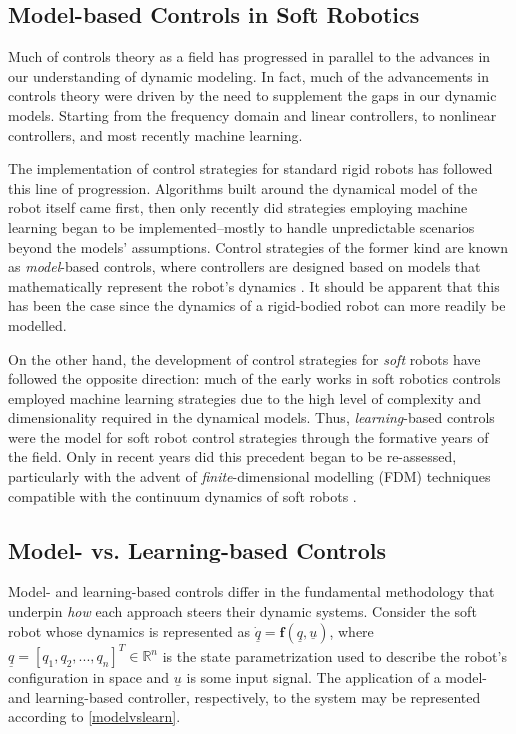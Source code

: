 \subsection{Model-based Controls in Soft Robotics} \label{modelbasedinsoro}
Much of controls theory as a field has progressed in parallel to the advances in our understanding of dynamic modeling. In fact, much of the advancements in controls theory were driven by the need to supplement the gaps in our dynamic models. Starting from the frequency domain and linear controllers, to nonlinear controllers, and most recently machine learning. 

The implementation of control strategies for standard rigid robots has followed this line of progression. Algorithms built around the dynamical model of the robot itself came first, then only recently did strategies employing machine learning began to be implemented--mostly to handle unpredictable scenarios beyond the models' assumptions. Control strategies of the former kind are known as \textit{model}-based controls, where controllers are designed based on models that mathematically represent the robot's dynamics \cite{rakhmatillaev_integrative_2025}. It should be apparent that this has been the case since the dynamics of a rigid-bodied robot can more readily be modelled. 

On the other hand, the development of control strategies for \textit{soft} robots have followed the opposite direction: much of the early works in soft robotics controls employed machine learning strategies due to the high level of complexity and dimensionality required in the dynamical models. Thus, \textit{learning}-based controls were the model for soft robot control strategies through the formative years of the field. Only in recent years did this precedent began to be re-assessed, particularly with the advent of \textit{finite}-dimensional modelling (FDM) techniques compatible with the continuum dynamics of soft robots \cite{della_santina_model-based_2023}.
\subsection{Model- vs. Learning-based Controls} \label{modelvlearndef}
% 
Model- and learning-based controls differ in the fundamental methodology that underpin \textit{how} each approach steers their dynamic systems. Consider the soft robot whose dynamics is represented as $\underline{\dot{q}}=\mathbf{f}(\underline{q},\underline{u})$, where $\underline{q} = [q_1,q_2,...,q_n]^T \in \mathbb{R}^n$ is the state parametrization used to describe the robot's configuration in space and $\underline{u}$ is some input signal. The application of a model- and learning-based controller, respectively, to the system may be represented according to \autoref{modelvslearn}.

